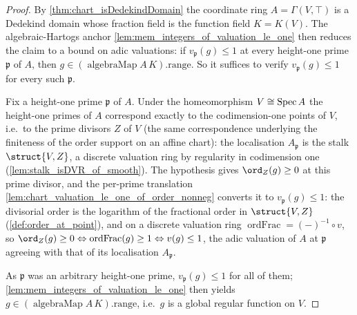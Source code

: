 \begin{proof}
        \leanok
  By \cref{thm:chart_isDedekindDomain} the coordinate ring \(A = \Gamma(V,
  \top)\) is a Dedekind domain whose fraction field is the function field
  \(K = K(V)\). The algebraic-Hartogs anchor
  \cref{lem:mem_integers_of_valuation_le_one} then reduces the claim to a bound
  on adic valuations: if \(v_{\mathfrak p}(g) \le 1\) at every height-one prime
  \(\mathfrak p\) of \(A\), then \(g \in (\operatorname{algebraMap} A\,K).\mathrm{range}\).
  So it suffices to verify \(v_{\mathfrak p}(g) \le 1\) for every such
  \(\mathfrak p\).

  Fix a height-one prime \(\mathfrak p\) of \(A\). Under the homeomorphism
  \(V \cong \operatorname{Spec} A\) the height-one primes of \(A\) correspond exactly to the
  codimension-one points of \(V\), i.e.\ to the prime divisors \(Z\) of \(V\)
  (the same correspondence underlying the finiteness of the order support on an
  affine chart): the localisation \(A_{\mathfrak p}\) is the stalk
  \(\struct{V, Z}\), a discrete valuation ring by regularity in codimension one
  (\cref{lem:stalk_isDVR_of_smooth}). The hypothesis gives \(\ord_Z(g) \ge 0\)
  at this prime divisor, and the per-prime translation
  \cref{lem:chart_valuation_le_one_of_order_nonneg} converts it to
  \(v_{\mathfrak p}(g) \le 1\): the divisorial order is the logarithm of the
  fractional order in \(\struct{V, Z}\) (\cref{def:order_at_point}), and on a
  discrete valuation ring \(\operatorname{ordFrac} = (-)^{-1} \circ v\), so
  \(\ord_Z(g) \ge 0 \Leftrightarrow \operatorname{ordFrac}(g) \ge 1
  \Leftrightarrow v(g) \le 1\), the adic valuation of \(A\) at \(\mathfrak p\)
  agreeing with that of its localisation \(A_{\mathfrak p}\).

  As \(\mathfrak p\) was an arbitrary height-one prime, \(v_{\mathfrak p}(g) \le
  1\) for all of them; \cref{lem:mem_integers_of_valuation_le_one} then yields
  \(g \in (\operatorname{algebraMap} A\,K).\mathrm{range}\), i.e.\ \(g\) is a
  global regular function on \(V\).
\end{proof}
